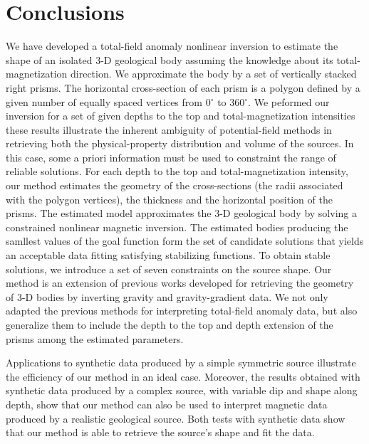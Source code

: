 \section{Conclusions}

We have developed a total-field anomaly nonlinear inversion to estimate the shape 
of an isolated 3-D geological body assuming the knowledge about its 
total-magnetization direction. We approximate the body by a set of vertically 
stacked right prisms. The horizontal cross-section of each prism is a polygon 
defined by a given number of equally spaced vertices from 0$^\circ$ to 360$^\circ$. 
We peformed our inversion for a set of given depths to the top and total-magnetization 
intensities these results illustrate the inherent ambiguity of potential-field methods in 
retrieving both the physical-property distribution and volume of the sources. 
In this case, some a priori information must 
be used to constraint the range of reliable solutions. For each depth to the top and total-magnetization intensity,
our method estimates the geometry of the cross-sections (the radii associated with the polygon vertices), the thickness and 
the horizontal position of the prisms. The estimated model approximates the 3-D geological body by 
solving a constrained nonlinear magnetic inversion.
The estimated bodies producing the samllest values of the goal function form the 
set of candidate solutions that yields an acceptable data fitting satisfying stabilizing functions. 
To obtain stable solutions, we introduce a set of seven constraints on the source 
shape.
Our method is an extension of previous works developed for retrieving the geometry 
of 3-D bodies by inverting gravity and gravity-gradient data. 
We not only adapted the previous methods for interpreting total-field anomaly data,
but also generalize them to include the depth to the top and depth extension of 
the prisms among the estimated parameters.

Applications to synthetic data produced by a simple symmetric source 
illustrate the efficiency of our method in an ideal case. Moreover, the results 
obtained with synthetic data produced by a complex source, with variable dip and 
shape along depth, show that our method can also be used to interpret magnetic 
data produced by a realistic geological source. 
Both tests with synthetic data show that our method is able to retrieve the 
source's shape and fit the data.

